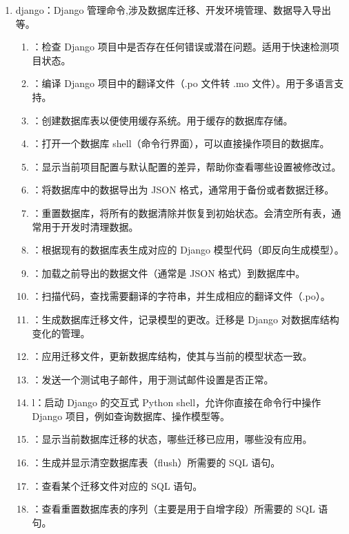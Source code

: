 \begin{enumerate}[label=\arabic*)]
  \item django：Django 管理命令,涉及数据库迁移、开发环境管理、数据导入导出等。
  \begin{enumerate}[itemindent=1em,label=\arabic*)]
    \item {}：检查 Django 项目中是否存在任何错误或潜在问题。适用于快速检测项目状态。
    \item {}：编译 Django 项目中的翻译文件（.po 文件转 .mo 文件）。用于多语言支持。
    \item {}：创建数据库表以便使用缓存系统。用于缓存的数据库存储。
    \item {}：打开一个数据库 shell（命令行界面），可以直接操作项目的数据库。
    \item {}：显示当前项目配置与默认配置的差异，帮助你查看哪些设置被修改过。
    \item {}：将数据库中的数据导出为 JSON 格式，通常用于备份或者数据迁移。
    \item {}：重置数据库，将所有的数据清除并恢复到初始状态。会清空所有表，通常用于开发时清理数据。
    \item {}：根据现有的数据库表生成对应的 Django 模型代码（即反向生成模型）。
    \item {}：加载之前导出的数据文件（通常是 JSON 格式）到数据库中。
    \item {}：扫描代码，查找需要翻译的字符串，并生成相应的翻译文件（.po）。
    \item {}：生成数据库迁移文件，记录模型的更改。迁移是 Django 对数据库结构变化的管理。
    \item {}：应用迁移文件，更新数据库结构，使其与当前的模型状态一致。
    \item {}：发送一个测试电子邮件，用于测试邮件设置是否正常。
    \item {}l：启动 Django 的交互式 Python shell，允许你直接在命令行中操作 Django 项目，例如查询数据库、操作模型等。
    \item {}：显示当前数据库迁移的状态，哪些迁移已应用，哪些没有应用。
    \item {}：生成并显示清空数据库表（flush）所需要的 SQL 语句。
    \item {}：查看某个迁移文件对应的 SQL 语句。
    \item {}：查看重置数据库表的序列（主要是用于自增字段）所需要的 SQL 语句。

\end{enumerate}
\end{enumerate}
